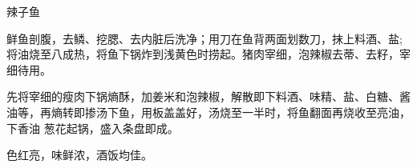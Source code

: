 \begin{recipe}{辣子鱼}

\ingredients


\preparation

\step 鲜鱼剖腹，去鳞、挖腮、去内脏后洗净；用刀在鱼背两面划数刀，抹上料酒、盐;
将油烧至八成热，将鱼下锅炸到浅黄色时捞起。猪肉宰细，泡辣椒去蒂、去籽，宰细待用。

\step 先将宰细的瘦肉下锅熵酥，加姜米和泡辣椒，解散即下料酒、味精、盐、白糖、酱
油等，再熵转即掺汤下鱼，用板盖盖好，汤烧至一半时，将鱼翻面再烧收至亮油，下香油
葱花起锅，盛入条盘即成。

\features

色红亮，味鲜浓，酒饭均佳。

\end{recipe}

